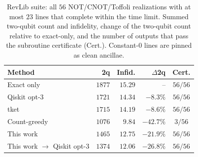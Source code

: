 \begin{table}[t]
\centering\small
\caption{RevLib suite: all $56$ NOT/CNOT/Toffoli realizations with at most $23$ lines that complete within the time limit. Summed two-qubit count and infidelity, change of
the two-qubit count relative to exact-only, and the number of outputs that pass the
subroutine certificate (Cert.). Constant-$0$ lines are pinned as clean ancillae.}
\label{tab:revlib}
\setlength{\tabcolsep}{3pt}
\begin{tabular}{lrrrc}
\toprule
Method & 2q & Infid. & $\Delta$2q & Cert. \\
\midrule
Exact only & $1877$ & $15.29$ & -- & $56/56$ \\
Qiskit opt-3 & $1721$ & $14.34$ & $-8.3\%$ & $56/56$ \\
tket & $1715$ & $14.19$ & $-8.6\%$ & $56/56$ \\
Count-greedy & $1076$ & $9.84$ & $-42.7\%$ & $3/56$ \\
This work & $1465$ & $12.75$ & $-21.9\%$ & $56/56$ \\
This work $\to$ Qiskit opt-3 & $1374$ & $12.06$ & $-26.8\%$ & $56/56$ \\
\bottomrule
\end{tabular}
\end{table}
